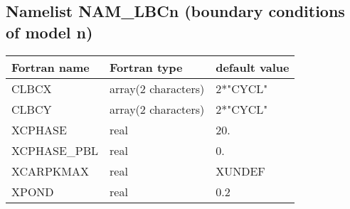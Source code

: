 \subsection{Namelist NAM\_LBCn (boundary conditions of model n)}

\begin{center}
\begin{tabular} {|l|l|l|}
\hline
Fortran name & Fortran type & default value \\
\hline
CLBCX        &  array(2 characters) & 2*"CYCL" \\
CLBCY        &  array(2 characters) & 2*"CYCL" \\
XCPHASE      & real                 &  20.     \\
XCPHASE\_PBL & real                 &  0.      \\
XCARPKMAX    & real                 &  XUNDEF  \\
XPOND        & real                 &  0.2  \\
\hline
\end{tabular}
\end{center}


